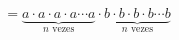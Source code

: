 \documentclass[preview]{standalone}
\begin{document}
\begin{align*}
= \underbrace{a\cdot a \cdot a\cdot a \cdots a}_{n \text{ vezes}}\cdot \underbrace{b \cdot b\cdot b \cdot b\cdots b }_{n \text{ vezes}}
\end{align*}
\end{document}
